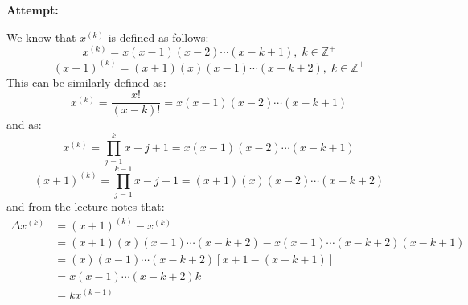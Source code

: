\documentclass[12pt,letterpaper]{article}
\theoremstyle{definition}
\begin{document}
\textbf{Attempt:}
\begin{changemargin}{.5cm}{0cm}

We know that $x^{(k)}$ is defined as follows:
\begin{equation*}
    x^{(k)}=x(x-1)(x-2)\cdots(x-k+1), \; k\in\mathbb{Z}^+
\end{equation*}
\begin{equation*}
    (x+1)^{(k)}=(x+1)(x)(x-1)\cdots(x-k+2), \; k\in\mathbb{Z}^+
\end{equation*}
This can be similarly defined as:
\begin{equation}\label{eq:deltafactorial}
    x^{(k)}=\dfrac{x!}{(x-k)!}=x(x-1)(x-2)\cdots(x-k+1) 
\end{equation}
and as:
\begin{equation}\label{eq:deltaprod}
    x^{(k)}=\prod_{j=1}^{k}x-j+1 = x(x-1)(x-2)\cdots(x-k+1) 
\end{equation}
\begin{equation*}
    (x+1)^{(k)}=\prod_{j=1}^{k-1}x-j+1 = (x+1)(x)(x-2)\cdots(x-k+2)
\end{equation*}
and from the lecture notes that:
\begin{align*}
    \Delta x^{(k)} &= (x+1)^{(k)}-x^{(k)}\\
                    &=(x+1)(x)(x-1)\cdots(x-k+2)-x(x-1)\cdots(x-k+2)(x-k+1)\\
                    &=(x)(x-1)\cdots(x-k+2)[x+1-(x-k+1)]\\
                    &=x(x-1)\cdots(x-k+2)k\\
                    &=kx^{(k-1)}
\end{align*}


\end{changemargin}
\end{document}
